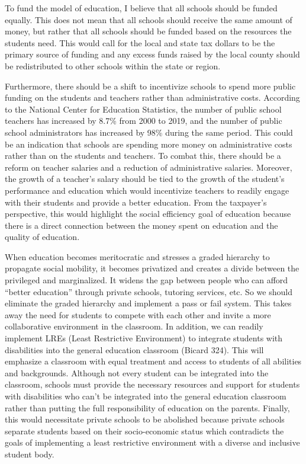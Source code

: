 \documentclass[12pt]{article}
\begin{document}
\begin{flushleft}
To fund the model of education, I believe that all schools should be funded equally. This
does not mean that all schools should receive the same amount of money, but rather that all schools
should be funded based on the resources the students need. This would call for the local and state
tax dollars to be the primary source of funding and any excess funds raised by the local county
should be redistributed to other schools within the state or region.

Furthermore, there should be a shift to incentivize schools to spend more public funding on the
students and teachers rather than administrative costs. According to the National Center for
Education Statistics, the number of public school teachers has increased by 8.7\% from 2000 to 2019,
and the number of public school administrators has increased by 98\% during the same period.
This could be an indication that schools are spending more money on administrative costs rather than
on the students and teachers. To combat this, there should be a reform on teacher salaries and a
reduction of administrative salaries. Moreover, the growth of a teacher's salary should be tied to
the growth of the student's performance and education which would incentivize teachers to readily
engage with their students and provide a better education. From the taxpayer's perspective,
this would highlight the social efficiency goal of education because there is a direct connection
between the money spent on education and the quality of education.

When education becomes meritocratic and stresses a graded hierarchy to propagate social mobility,
it becomes privatized and creates a divide between the privileged and marginalized. It widens the 
gap between people who can afford ``better education'' through private schools, tutoring services,
etc. So we should eliminate the graded hierarchy and implement a pass or fail system. This
takes away the need for students to compete with each other and invite a more collaborative
environment in the classroom. In addition, we can readily implement LREs
(Least Restrictive Environment) to integrate students with disabilities into the general education
classroom (Bicard 324). This will emphasize a classroom with equal treatment and access to students
of all abilities and backgrounds. Although not every student can be integrated into the classroom,
schools must provide the necessary resources and support for students with
disabilities who can't be integrated into the general education classroom rather than putting the
full responsibility of education on the parents. Finally, this would necessitate private schools to
be abolished because private schools separate students based on their socio-economic status which 
contradicts the goals of implementing a least restrictive environment with a diverse and inclusive
student body.


\end{flushleft}
\end{document}
